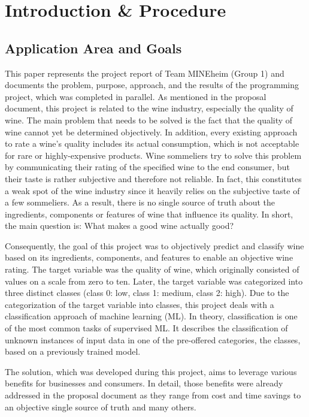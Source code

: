 \chapter{Introduction \& Procedure}
\section{Application Area and Goals}


This paper represents the project report of Team MINEheim (Group 1) and documents the problem, purpose, approach, and the results of the programming project, which was completed in parallel. As mentioned in the proposal document, this project is related to the wine industry, especially the quality of wine. The main problem that needs to be solved is the fact that the quality of wine cannot yet be determined objectively. In addition, every existing approach to rate a wine's quality includes its actual consumption, which is not acceptable for rare or highly-expensive products. Wine sommeliers try to solve this problem by communicating their rating of the specified wine to the end consumer, but their taste is rather subjective and therefore not reliable. In fact, this constitutes a weak spot of the wine industry since it heavily relies on the subjective taste of a few sommeliers. As a result, there is no single source of truth about the ingredients, components or features of wine that influence its quality. In short, the main question is: What makes a good wine actually good?

Consequently, the goal of this project was to objectively predict and classify wine based on its ingredients, components, and features to enable an objective wine rating. The target variable was the quality of wine, which originally consisted of values on a scale from zero to ten. Later, the target variable was categorized into three distinct classes (class 0: low, class 1: medium, class 2: high). Due to the categorization of the target variable into classes, this project deals with a classification approach of machine learning (ML). In theory, classification is one of the most common tasks of supervised ML. It describes the classification of unknown instances of input data in one of the pre-offered categories, the classes, based on a previously trained model. \citep{Novakovic2010}

The solution, which was developed during this project, aims to leverage various benefits for businesses and consumers. In detail, those benefits were already addressed in the proposal document as they range from cost and time savings to an objective single source of truth and many others. 
